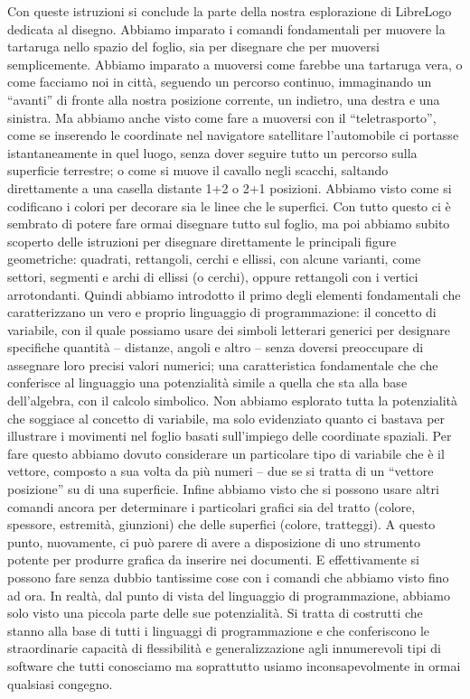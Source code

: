 Con queste istruzioni si conclude la parte della nostra esplorazione di LibreLogo dedicata al disegno. Abbiamo imparato i comandi fondamentali per muovere la tartaruga nello spazio del foglio, sia per disegnare che per muoversi semplicemente. Abbiamo imparato a muoversi come farebbe una tartaruga vera, o come facciamo noi in città, seguendo un percorso continuo, immaginando un “avanti” di fronte alla nostra posizione corrente, un indietro, una destra e una sinistra. Ma abbiamo anche visto come fare a muoversi con il “teletrasporto”, come se inserendo le coordinate nel navigatore satellitare l'automobile ci portasse istantaneamente in quel luogo, senza dover seguire tutto un percorso sulla superficie terrestre; o come si muove il cavallo negli scacchi, saltando direttamente a una casella distante 1+2 o 2+1 posizioni.   Abbiamo visto come si codificano i colori per decorare sia le linee che le superfici. Con tutto questo ci è sembrato di potere fare ormai disegnare tutto sul foglio, ma poi abbiamo subito scoperto delle istruzioni per disegnare direttamente le principali figure geometriche: quadrati, rettangoli, cerchi e ellissi, con alcune varianti, come settori, segmenti e archi di ellissi (o cerchi), oppure rettangoli con i vertici arrotondanti. Quindi abbiamo introdotto il primo degli elementi fondamentali che caratterizzano un vero e proprio linguaggio di programmazione: il concetto di variabile, con il quale possiamo usare dei simboli letterari generici per designare specifiche quantità – distanze, angoli e altro – senza doversi preoccupare di assegnare loro precisi valori numerici; una caratteristica fondamentale che che conferisce al linguaggio una potenzialità simile a quella che sta alla base dell'algebra, con il calcolo simbolico. Non abbiamo esplorato tutta la potenzialità che soggiace al concetto di variabile, ma solo evidenziato quanto ci bastava per illustrare i movimenti nel foglio basati sull'impiego delle coordinate spaziali. Per fare questo abbiamo dovuto considerare un particolare tipo di variabile che è il vettore, composto a sua volta da più numeri – due se si tratta di un “vettore posizione” su di una superficie. Infine abbiamo visto che si possono usare altri comandi ancora per determinare i particolari grafici sia del tratto (colore, spessore, estremità, giunzioni) che delle superfici (colore, tratteggi). A questo punto, nuovamente, ci può parere di avere a disposizione di uno strumento potente per produrre grafica da inserire nei documenti. E effettivamente si possono fare senza dubbio tantissime cose con i comandi che abbiamo visto fino ad ora. In realtà, dal punto di vista del linguaggio di programmazione, abbiamo solo visto una piccola parte delle sue potenzialità. Si tratta di costrutti che stanno alla base di tutti i linguaggi di programmazione e che conferiscono le straordinarie capacità di flessibilità e generalizzazione agli innumerevoli tipi di software che tutti conosciamo ma soprattutto usiamo inconsapevolmente in ormai qualsiasi congegno.



















